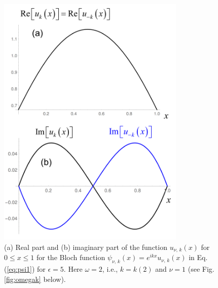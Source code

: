\begin{figure}
    \includegraphics[width=0.8\textwidth, keepaspectratio]{figures/system/u.png}
    \caption{(a) Real part and (b) imaginary part of the function $u_{\nu,\,k}(x)$ 
    for $0 \le x \le 1$ for the Bloch function 
    $\psi_{\nu,\,k}(x) = e^{i k x} u_{\nu,\,k}(x)$ in Eq.\,(\ref{eq:psi1}) for $\epsilon=5$. 
    Here $\omega=2$, i.e., $k = k(2)$ and $\nu=1$ (see Fig.\,\ref{fig:omegak} below).}
    \label{fig:u}
\end{figure}

